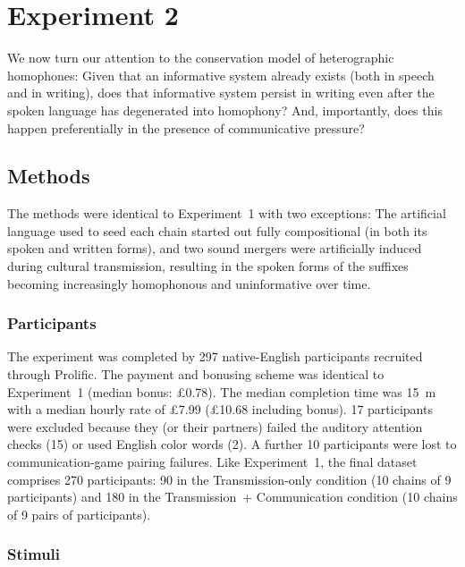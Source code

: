 \documentclass[doc,biblatex]{apa7}
\begin{document}

\section{Experiment 2}

We now turn our attention to the conservation model of heterographic homophones: Given that an informative system already exists (both in speech and in writing), does that informative system persist in writing even after the spoken language has degenerated into homophony? And, importantly, does this happen preferentially in the presence of communicative pressure?

\subsection{Methods}

The methods were identical to Experiment~1 with two exceptions: The artificial language used to seed each chain started out fully compositional (in both its spoken and written forms), and two sound mergers were artificially induced during cultural transmission, resulting in the spoken forms of the suffixes becoming increasingly homophonous and uninformative over time.

\subsubsection{Participants}

The experiment was completed by 297 native-English participants recruited through Prolific. The payment and bonusing scheme was identical to Experiment~1 (median bonus: £0.78). The median completion time was 15~m with a median hourly rate of £7.99 (£10.68 including bonus). 17 participants were excluded because they (or their partners) failed the auditory attention checks (15) or used English color words (2). A further 10 participants were lost to communication-game pairing failures. Like Experiment~1, the final dataset comprises 270 participants: 90 in the Transmission-only condition (10 chains of 9 participants) and 180 in the Transmission~+ Communication condition (10 chains of 9 pairs of participants).

\subsubsection{Stimuli}
\end{document}
